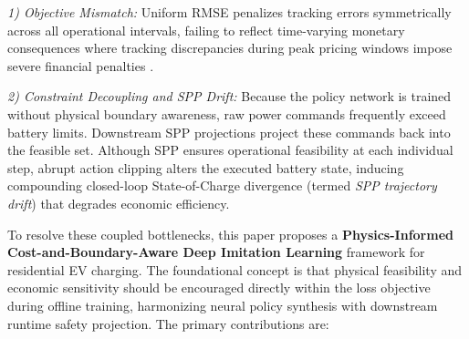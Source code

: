 \documentclass[journal]{IEEEtran}
\theoremstyle{remark}
\begin{document}
\textit{1) Objective Mismatch:} Uniform RMSE penalizes tracking errors symmetrically across all operational intervals, failing to reflect time-varying monetary consequences where tracking discrepancies during peak pricing windows impose severe financial penalties \cite{dorokhova2021}.

\textit{2) Constraint Decoupling and SPP Drift:} Because the policy network is trained without physical boundary awareness, raw power commands frequently exceed battery limits. Downstream SPP projections project these commands back into the feasible set. Although SPP ensures operational feasibility at each individual step, abrupt action clipping alters the executed battery state, inducing compounding closed-loop State-of-Charge divergence (termed \textit{SPP trajectory drift}) that degrades economic efficiency.

To resolve these coupled bottlenecks, this paper proposes a \textbf{Physics-Informed Cost-and-Boundary-Aware Deep Imitation Learning} framework for residential EV charging. The foundational concept is that physical feasibility and economic sensitivity should be encouraged directly within the loss objective during offline training, harmonizing neural policy synthesis with downstream runtime safety projection. The primary contributions are:
\end{document}
